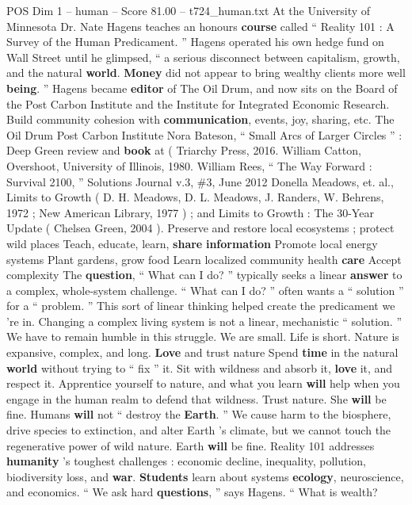 \begin{textsample}{POS Dim 1 – human – Score 81.00 – t724\_human.txt}  \label{ex:f1_pos_013}
At the University of Minnesota Dr.
Nate Hagens teaches an honours \textbf{course} called “ Reality 101 : A Survey of the Human Predicament. ” Hagens operated his own hedge fund on Wall Street until he glimpsed, “ a serious disconnect between capitalism, growth, and the natural \textbf{world}. \textbf{Money} did not appear to bring wealthy clients more well \textbf{being}. ” Hagens became \textbf{editor} of The Oil Drum, and now sits on the Board of the Post Carbon Institute and the Institute for Integrated Economic Research.
Build community cohesion with \textbf{communication}, events, joy, sharing, etc.
The Oil Drum Post Carbon Institute Nora Bateson, “ Small Arcs of Larger Circles ” : Deep Green review and \textbf{book} at ( Triarchy Press, 2016.
William Catton, Overshoot, University of Illinois, 1980.
William Rees, “ The Way Forward : Survival 2100, ” Solutions Journal v.3, \#3, June 2012 Donella Meadows, et. al., Limits to Growth ( D.
H.
Meadows, D.
L.
Meadows, J.
Randers, W.
Behrens, 1972 ; New American Library, 1977 ) ; and Limits to Growth : The 30-Year Update ( Chelsea Green, 2004 ).
Preserve and restore local ecosystems ; protect wild places Teach, educate, learn, \textbf{share} \textbf{information} Promote local energy systems Plant gardens, grow food Learn localized community health \textbf{care} Accept complexity The \textbf{question}, “ What can I do? ” typically seeks a linear \textbf{answer} to a complex, whole-system challenge. “ What can I do? ” often wants a “ solution ” for a “ problem. ” This sort of linear thinking helped create the predicament we ’re in.
Changing a complex living system is not a linear, mechanistic “ solution. ” We have to remain humble in this struggle.
We are small.
Life is short.
Nature is expansive, complex, and long. \textbf{Love} and trust nature Spend \textbf{time} in the natural \textbf{world} without trying to “ fix ” it.
Sit with wildness and absorb it, \textbf{love} it, and respect it.
Apprentice yourself to nature, and what you learn \textbf{will} help when you engage in the human realm to defend that wildness.
Trust nature.
She \textbf{will} be fine.
Humans \textbf{will} not “ destroy the \textbf{Earth}. ” We cause harm to the biosphere, drive species to extinction, and alter Earth ’s climate, but we cannot touch the regenerative power of wild nature.
Earth \textbf{will} be fine.
Reality 101 addresses \textbf{humanity} ’s toughest challenges : economic decline, inequality, pollution, biodiversity loss, and \textbf{war}. \textbf{Students} learn about systems \textbf{ecology}, neuroscience, and economics. “ We ask hard \textbf{questions}, ” says Hagens. “ What is wealth?

\end{textsample}
